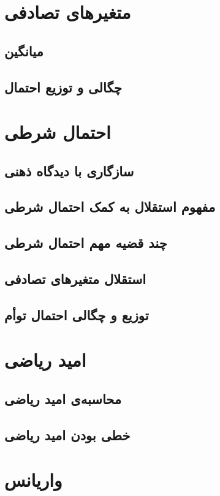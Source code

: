 \documentclass{article}
\begin{document}
\section{متغیرهای تصادفی}
\subsection{میانگین}
\subsection{چگالی و توزیع احتمال}


\section{احتمال شرطی}
\subsection{سازگاری با دیدگاه ذهنی}
\subsection{مفهوم استقلال به کمک احتمال شرطی}
\subsection{چند قضیه مهم احتمال شرطی}
\subsection{استقلال متغیرهای تصادفی}
\subsection{توزیع و چگالی احتمال توأم}


\section{امید ریاضی}
\subsection{محاسبه‌ی امید ریاضی}
\subsection{خطی بودن امید ریاضی}

\section{واریانس}
\end{document}
